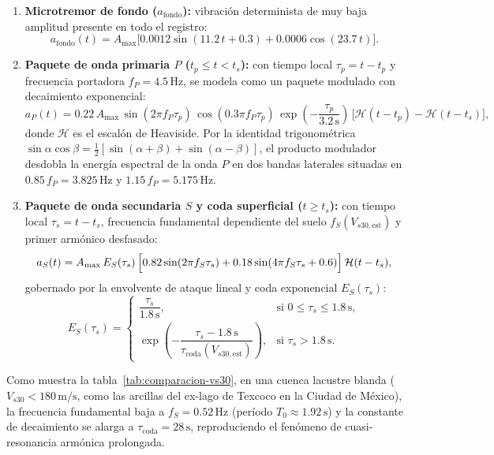 \documentclass[11pt,a4paper]{article}
\newcommand{\unit}[1]{\mathrm{#1}}
\begin{document}
\begin{enumerate}
  \item \textbf{Microtremor de fondo ($a_{\mathrm{fondo}}$):} vibración determinista de muy baja amplitud
        presente en todo el registro:
        \begin{equation}
          a_{\mathrm{fondo}}(t) = A_{\max}\bigl[0.0012\sin(11.2\,t + 0.3) + 0.0006\cos(23.7\,t)\bigr].
          \label{eq:sismo-fondo}
        \end{equation}
  \item \textbf{Paquete de onda primaria $P$ ($t_p \le t < t_s$):} con tiempo local $\tau_p = t - t_p$ y
        frecuencia portadora $f_P = 4.5\,\unit{Hz}$, se modela como un paquete modulado con decaimiento
        exponencial:
        \begin{equation}
          a_P(t) = 0.22\,A_{\max}\,\sin(2\pi f_P \tau_p)\,\cos(0.3\pi f_P \tau_p)\,
                   \exp\!\left(-\frac{\tau_p}{3.2\,\unit{s}}\right)\,
                   \bigl[\mathcal{H}(t - t_p) - \mathcal{H}(t - t_s)\bigr],
          \label{eq:sismo-onda-p}
        \end{equation}
        donde $\mathcal{H}$ es el escalón de Heaviside. Por la identidad trigonométrica
        $\sin\alpha\cos\beta = \tfrac12[\sin(\alpha+\beta)+\sin(\alpha-\beta)]$, el producto modulador desdobla
        la energía espectral de la onda $P$ en dos bandas laterales situadas en
        $0.85\,f_P = 3.825\,\unit{Hz}$ y $1.15\,f_P = 5.175\,\unit{Hz}$.
  \item \textbf{Paquete de onda secundaria $S$ y coda superficial ($t \ge t_s$):} con tiempo local
        $\tau_s = t - t_s$, frecuencia fundamental dependiente del suelo $f_S(V_{s30,\mathrm{est}})$ y primer
        armónico desfasado:
        \begin{equation}
          a_S(t) = A_{\max}\,E_S(\tau_s)\,\Bigl[
            0.82\sin(2\pi f_S \tau_s) + 0.18\sin(4\pi f_S \tau_s + 0.6)
          \Bigr]\,\mathcal{H}(t - t_s),
          \label{eq:sismo-onda-s}
        \end{equation}
        gobernado por la envolvente de ataque lineal y coda exponencial $E_S(\tau_s)$:
        \begin{equation}
          E_S(\tau_s) =
          \begin{cases}
            \dfrac{\tau_s}{1.8\,\unit{s}}, & \text{si } 0 \le \tau_s \le 1.8\,\unit{s},\\[8pt]
            \exp\!\left(-\dfrac{\tau_s - 1.8\,\unit{s}}{\tau_{\mathrm{coda}}(V_{s30,\mathrm{est}})}\right), &
              \text{si } \tau_s > 1.8\,\unit{s}.
          \end{cases}
          \label{eq:envolvente-s}
        \end{equation}
\end{enumerate}
Como muestra la tabla~\ref{tab:comparacion-vs30}, en una cuenca lacustre blanda ($V_{s30} < 180\,\unit{m/s}$,
como las arcillas del ex-lago de Texcoco en la Ciudad de México), la frecuencia fundamental baja a
$f_S = 0.52\,\unit{Hz}$ (período $T_0 \approx 1.92\,\unit{s}$) y la constante de decaimiento se alarga a
$\tau_{\mathrm{coda}} = 28\,\unit{s}$, reproduciendo el fenómeno de cuasi-resonancia armónica prolongada.
\end{document}
